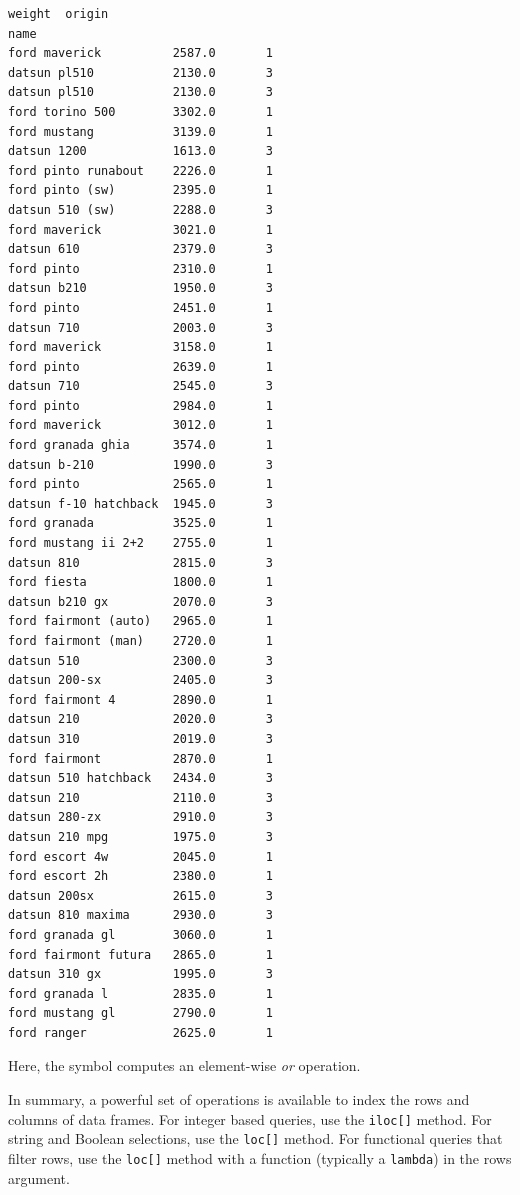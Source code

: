 \documentclass[11pt]{article}
\makeatletter
\newcommand{\boxspacing}{\kern\kvtcb@left@rule\kern\kvtcb@boxsep}
\newcommand{\prompt}[4]{
        {\ttfamily\llap{{\color{#2}[#3]:\hspace{3pt}#4}}\vspace{-\baselineskip}}
    }
\makeatother
\begin{document}
            \begin{tcolorbox}[breakable, size=fbox, boxrule=.5pt, pad at break*=1mm, opacityfill=0]
\prompt{Out}{outcolor}{96}{\boxspacing}
\begin{Verbatim}[commandchars=\\\{\}]
                       weight  origin
name
ford maverick          2587.0       1
datsun pl510           2130.0       3
datsun pl510           2130.0       3
ford torino 500        3302.0       1
ford mustang           3139.0       1
datsun 1200            1613.0       3
ford pinto runabout    2226.0       1
ford pinto (sw)        2395.0       1
datsun 510 (sw)        2288.0       3
ford maverick          3021.0       1
datsun 610             2379.0       3
ford pinto             2310.0       1
datsun b210            1950.0       3
ford pinto             2451.0       1
datsun 710             2003.0       3
ford maverick          3158.0       1
ford pinto             2639.0       1
datsun 710             2545.0       3
ford pinto             2984.0       1
ford maverick          3012.0       1
ford granada ghia      3574.0       1
datsun b-210           1990.0       3
ford pinto             2565.0       1
datsun f-10 hatchback  1945.0       3
ford granada           3525.0       1
ford mustang ii 2+2    2755.0       1
datsun 810             2815.0       3
ford fiesta            1800.0       1
datsun b210 gx         2070.0       3
ford fairmont (auto)   2965.0       1
ford fairmont (man)    2720.0       1
datsun 510             2300.0       3
datsun 200-sx          2405.0       3
ford fairmont 4        2890.0       1
datsun 210             2020.0       3
datsun 310             2019.0       3
ford fairmont          2870.0       1
datsun 510 hatchback   2434.0       3
datsun 210             2110.0       3
datsun 280-zx          2910.0       3
datsun 210 mpg         1975.0       3
ford escort 4w         2045.0       1
ford escort 2h         2380.0       1
datsun 200sx           2615.0       3
datsun 810 maxima      2930.0       3
ford granada gl        3060.0       1
ford fairmont futura   2865.0       1
datsun 310 gx          1995.0       3
ford granada l         2835.0       1
ford mustang gl        2790.0       1
ford ranger            2625.0       1
\end{Verbatim}
\end{tcolorbox}
        
    Here, the symbol \texttt{\textbar{}} computes an element-wise \emph{or}
operation.

In summary, a powerful set of operations is available to index the rows
and columns of data frames. For integer based queries, use the
\texttt{iloc{[}{]}} method. For string and Boolean selections, use the
\texttt{loc{[}{]}} method. For functional queries that filter rows, use
the \texttt{loc{[}{]}} method with a function (typically a
\texttt{lambda}) in the rows argument.
\end{document}

